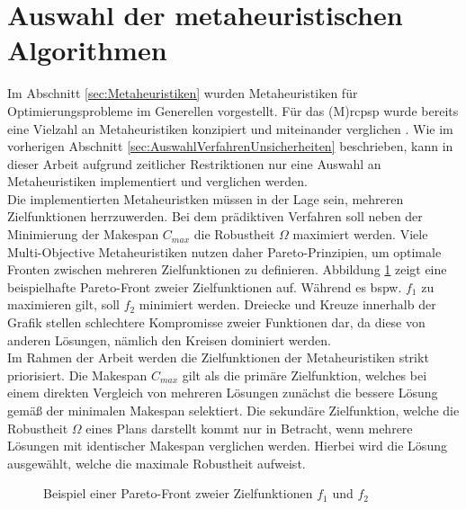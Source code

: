 \newpage

\section{Auswahl der metaheuristischen Algorithmen} \label{sec:AuswahlMetaheuristischenAlgorithmen}

Im Abschnitt \ref{sec:Metaheuristiken} wurden Metaheuristiken für Optimierungsprobleme im Generellen vorgestellt. Für das (M)\ac{rcpsp} wurde bereits eine Vielzahl an Metaheuristiken konzipiert und miteinander verglichen \cite[vgl. ][S. 16 ff.]{kolisch_heuristic_1998}. Wie im vorherigen Abschnitt \ref{sec:AuswahlVerfahrenUnsicherheiten} beschrieben, kann in dieser Arbeit aufgrund zeitlicher Restriktionen nur eine Auswahl an Metaheuristiken implementiert und verglichen werden. \\

Die implementierten Metaheuristken müssen in der Lage sein, mehreren Zielfunktionen herrzuwerden. Bei dem prädiktiven Verfahren soll neben der Minimierung der Makespan $C_{max}$ die Robustheit $\Omega$ maximiert werden. Viele Multi-Objective Metaheuristiken nutzen daher Pareto-Prinzipien, um optimale Fronten zwischen mehreren Zielfunktionen zu definieren. Abbildung \ref{img:paretofront} zeigt eine beispielhafte Pareto-Front zweier Zielfunktionen auf. Während es bspw. $f_1$ zu maximieren gilt, soll $f_2$ minimiert werden. Dreiecke und Kreuze innerhalb der Grafik stellen schlechtere Kompromisse zweier Funktionen dar, da diese von anderen Lösungen, nämlich den Kreisen dominiert werden. \cite[vgl.][S. 285 ff.]{talbi_multi-objective_2012} \\

Im Rahmen der Arbeit werden die Zielfunktionen der Metaheuristiken strikt priorisiert. Die Makespan $C_{max}$ gilt als die primäre Zielfunktion, welches bei einem direkten Vergleich von mehreren Lösungen zunächst die bessere Lösung gemäß der minimalen Makespan selektiert. Die sekundäre Zielfunktion, welche die Robustheit $\Omega$ eines Plans darstellt kommt nur in Betracht, wenn mehrere Lösungen mit identischer Makespan verglichen werden. Hierbei wird die Lösung ausgewählt, welche die maximale Robustheit aufweist. 

\begin{figure}[H]
    \centering
    \noindent{}
    \caption{Beispiel einer Pareto-Front zweier Zielfunktionen $f_1$ und $f_2$} 
    \label{img:paretofront}
\end{figure}

